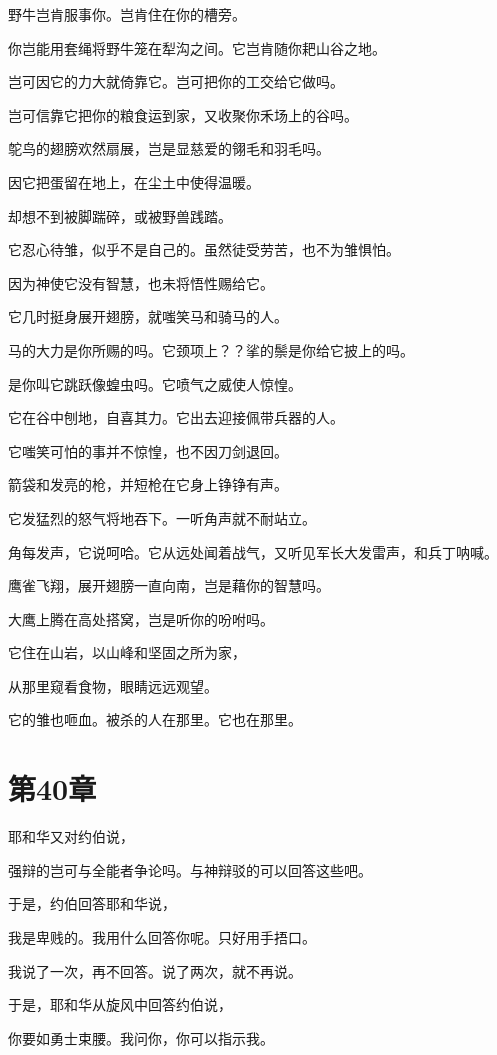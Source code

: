 \documentclass[12pt,oneside]{book}
\begin{document}
野牛岂肯服事你。岂肯住在你的槽旁。

你岂能用套绳将野牛笼在犁沟之间。它岂肯随你耙山谷之地。

岂可因它的力大就倚靠它。岂可把你的工交给它做吗。

岂可信靠它把你的粮食运到家，又收聚你禾场上的谷吗。

鸵鸟的翅膀欢然扇展，岂是显慈爱的翎毛和羽毛吗。

因它把蛋留在地上，在尘土中使得温暖。

却想不到被脚踹碎，或被野兽践踏。

它忍心待雏，似乎不是自己的。虽然徒受劳苦，也不为雏惧怕。

因为神使它没有智慧，也未将悟性赐给它。

它几时挺身展开翅膀，就嗤笑马和骑马的人。

马的大力是你所赐的吗。它颈项上？？挲的鬃是你给它披上的吗。

是你叫它跳跃像蝗虫吗。它喷气之威使人惊惶。

它在谷中刨地，自喜其力。它出去迎接佩带兵器的人。

它嗤笑可怕的事并不惊惶，也不因刀剑退回。

箭袋和发亮的枪，并短枪在它身上铮铮有声。

它发猛烈的怒气将地吞下。一听角声就不耐站立。

角每发声，它说呵哈。它从远处闻着战气，又听见军长大发雷声，和兵丁呐喊。

鹰雀飞翔，展开翅膀一直向南，岂是藉你的智慧吗。

大鹰上腾在高处搭窝，岂是听你的吩咐吗。

它住在山岩，以山峰和坚固之所为家，

从那里窥看食物，眼睛远远观望。

它的雏也咂血。被杀的人在那里。它也在那里。


\chapter{第40章}
耶和华又对约伯说，

强辩的岂可与全能者争论吗。与神辩驳的可以回答这些吧。

于是，约伯回答耶和华说，

我是卑贱的。我用什么回答你呢。只好用手捂口。

我说了一次，再不回答。说了两次，就不再说。

于是，耶和华从旋风中回答约伯说，

你要如勇士束腰。我问你，你可以指示我。
\end{document}
